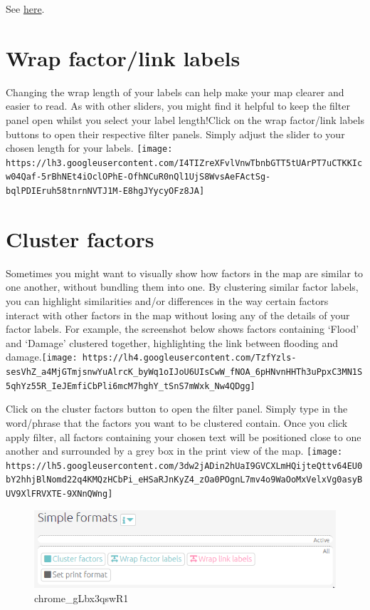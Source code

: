 \documentclass[
]{book}
\begin{document}
See \protect\hyperlink{xfixed-colours}{here}.

\hypertarget{wrap-factorlink-labels}{%
\section{Wrap factor/link labels}\label{wrap-factorlink-labels}}

Changing the wrap length of your labels can help make your map clearer and easier to read. As with other sliders, you might find it helpful to keep the filter panel open whilst you select your label length!Click on the wrap factor/link labels buttons to open their respective filter panels. Simply adjust the slider to your chosen length for your labels. \texttt{[image: https://lh3.googleusercontent.com/I4TIZreXFvlVnwTbnbGTT5tUArPT7uCTKKIcw04Qaf-5rBhNEt4iOclOPhE-OfhNCuR0nQl1UjS8WvsAeFActSg-bqlPDIEruh58tnrnNVTJ1M-E8hgJYycyOFz8JA]}

\hypertarget{xcluster-factors}{%
\section{Cluster factors}\label{xcluster-factors}}

Sometimes you might want to visually show how factors in the map are similar to one another, without bundling them into one. By clustering similar factor labels, you can highlight similarities and/or differences in the way certain factors interact with other factors in the map without losing any of the details of your factor labels. For example, the screenshot below shows factors containing `Flood' and `Damage' clustered together, highlighting the link between flooding and damage.\texttt{[image: https://lh4.googleusercontent.com/TzfYzls-sesVhZ\_a4MjGTmjsnwYuAlrcK\_byWq1oIJoU6UIsCwW\_fNOA\_6pHNvnHHTh3uPpxC3MN1S5qhYz55R\_IeJEmfiCbPli6mcM7hghY\_tSnS7mWxk\_Nw4QDgg]}

Click on the cluster factors button to open the filter panel. Simply type in the word/phrase that the factors you want to be clustered contain. Once you click apply filter, all factors containing your chosen text will be positioned close to one another and surrounded by a grey box in the print view of the map. \texttt{[image: https://lh5.googleusercontent.com/3dw2jADin2hUaI9GVCXLmHQijteQttv64EU0bY2hhjBlNomd22q4KMQzHCbPi\_eHSaRJnKyZ4\_zOa0POgnL7mv4o9WaOoMxVelxVg0asyBUV9XlFRVXTE-9XNnQWng]}

\begin{figure}
\centering
\includegraphics[width=6.77083in,height=\textheight]{_assets/chrome_gLbx3qswR1.png}
\caption{chrome\_gLbx3qswR1}
\end{figure}
\end{document}
